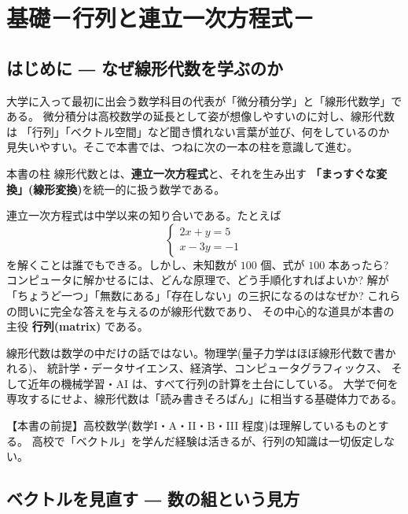 \part{基礎－行列と連立一次方程式－}

\chapter*{はじめに ― なぜ線形代数を学ぶのか}

大学に入って最初に出会う数学科目の代表が「微分積分学」と「線形代数学」である。
微分積分は高校数学の延長として姿が想像しやすいのに対し、線形代数は
「行列」「ベクトル空間」など聞き慣れない言葉が並び、何をしているのか
見失いやすい。そこで本書では、つねに次の一本の柱を意識して進む。

\begin{itembox}[l]{本書の柱}
線形代数とは、\textbf{連立一次方程式}と、それを生み出す
\textbf{「まっすぐな変換」(線形変換)}を統一的に扱う数学である。
\end{itembox}

連立一次方程式は中学以来の知り合いである。たとえば
\[
\begin{cases}
2x + y = 5 \\
x - 3y = -1
\end{cases}
\]
を解くことは誰でもできる。しかし、未知数が $100$ 個、式が $100$ 本あったら?
コンピュータに解かせるには、どんな原理で、どう手順化すればよいか?
解が「ちょうど一つ」「無数にある」「存在しない」の三択になるのはなぜか?
これらの問いに完全な答えを与えるのが線形代数であり、
その中心的な道具が本書の主役 \textbf{行列(matrix)} である。

線形代数は数学の中だけの話ではない。物理学(量子力学はほぼ線形代数で書かれる)、
統計学・データサイエンス、経済学、コンピュータグラフィックス、
そして近年の機械学習・AI は、すべて行列の計算を土台にしている。
大学で何を専攻するにせよ、線形代数は「読み書きそろばん」に相当する基礎体力である。

\bigskip
\noindent
【本書の前提】高校数学(数学I・A・II・B・III 程度)は理解しているものとする。
高校で「ベクトル」を学んだ経験は活きるが、行列の知識は一切仮定しない。

\chapter{ベクトルを見直す ― 数の組という見方}

